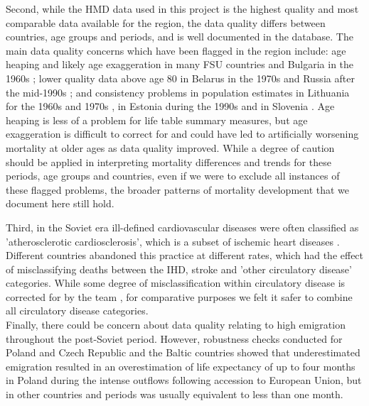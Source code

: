 \documentclass{article}
\begin{document}
\begin{spacing}{1.5}
\textcolor[rgb]{0,0.58,0}{Second, while the HMD data used in this project is the highest quality and most comparable data available for the region, the data quality differs between countries, age groups and periods, and is well documented in the database. The main data quality concerns which have been flagged in the region include: age heaping and likely age exaggeration in many FSU countries and Bulgaria in the 1960s \citep{grigoriev2017,jasilionis2017Latvia, jdanov2017, pyrozhkov2017, philipov2017}; lower quality data above age 80 in Belarus in the 1970s \citep{grigoriev2017} and Russia after the mid-1990s \citep{jdanov2017}; and consistency problems in population estimates in Lithuania for the 1960s and 1970s \citep{jasilionis2017Lithuania}, in Estonia during the 1990s \citep{jasilionis2017Estonia} and in Slovenia \citep{jasilionis2017Slovenia}. Age heaping is less of a problem for life table summary measures, but age exaggeration is difficult to correct for and could have led to artificially worsening mortality at older ages as data quality improved. While a degree of caution should be applied in interpreting mortality differences and trends for these periods, age groups and countries, even if we were to exclude all instances of these flagged problems, the broader patterns of mortality development that we document here still hold.\\   
}

\textcolor[rgb]{0,0.58,0}{Third, in the Soviet era ill-defined cardiovascular diseases were often classified as 'atherosclerotic cardiosclerosis', which is a subset of ischemic heart diseases \citep{jasilionis2011,shkolnikov2012data}. Different countries abandoned this practice at different rates, which had the effect of misclassifying deaths between the IHD, stroke and 'other circulatory disease' categories. While some degree of misclassification within circulatory disease is corrected for by the \citet{HcO} team \citep{Pechholdova2017}, for comparative purposes we felt it safer to combine all circulatory disease categories.} \\

\textcolor[rgb]{1,0,0}{Finally, there could be concern about data quality relating to high emigration throughout the post-Soviet period. However, robustness checks conducted for Poland and Czech Republic \citep{Fihel2017} and the Baltic countries \citep{jasilionis2011} showed that underestimated emigration resulted in an overestimation of life expectancy of up to four months in Poland during the intense outflows following accession to European Union, but in other countries and periods was usually equivalent to less than one month.} \\



\end{spacing}
\end{document}
